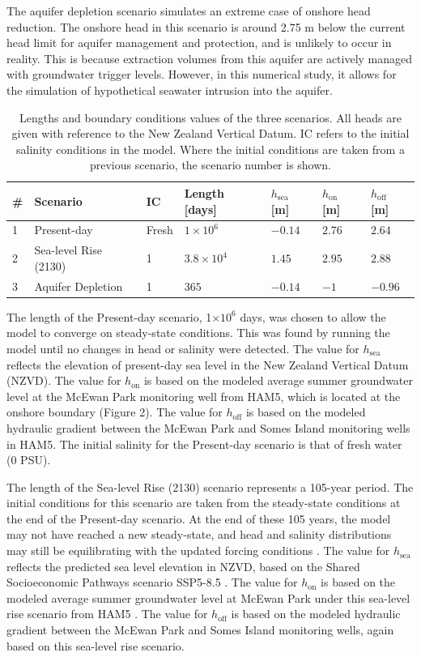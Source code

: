 \documentclass[pdflatex,sn-apa]{sn-jnl}%
\begin{document}
The aquifer depletion scenario simulates an extreme case of onshore head reduction.
The onshore head in this scenario is around 2.75 m below the current head limit for aquifer management and protection, and is unlikely to occur in reality.
This is because extraction volumes from this aquifer are actively managed with groundwater trigger levels.
However, in this numerical study, it allows for the simulation of hypothetical seawater intrusion into the aquifer.


\begin{table}[h!]
\centering
\caption{Lengths and boundary conditions values of the three scenarios. All heads are given with reference to the New Zealand Vertical Datum. IC refers to the initial salinity conditions in the model. Where the initial conditions are taken from a previous scenario, the scenario number is shown.}
\begin{tabular}{lllllll}
\hline
\# & Scenario & IC &Length [days] & $h_{\mathrm{sea}}$ [m] & $h_{\mathrm{on}}$ [m] & $h_{\mathrm{off}}$ [m] \\
\hline
1 & Present-day & Fresh & $1\times 10^{6}$& $-0.14$  & $2.76$ & $2.64$\\
2 & Sea-level Rise (2130) & 1 & $3.8\times 10^{4}$ & $1.45$  & $2.95$ & $2.88$\\
3 & Aquifer Depletion & 1 & $365$& $-0.14$  & $-1$ & $-0.96$\\
\hline
\end{tabular}
\label{tab:table_stages}
\end{table}

The length of the Present-day scenario, 1$\times10^6$ days, was chosen to allow the model to converge on steady-state conditions.
This was found by running the model until no changes in head or salinity were detected.
The value for $h_{\mathrm{sea}}$ reflects the elevation of present-day sea level in the New Zealand Vertical Datum (NZVD).
The value for $h_{\mathrm{on}}$ is based on the modeled average summer groundwater level at the McEwan Park monitoring well from HAM5, which is located at the onshore boundary (Figure 2).
The value for $h_{\mathrm{off}}$ is based on the modeled hydraulic gradient between the McEwan Park and Somes Island monitoring wells in HAM5.
The initial salinity for the Present-day scenario is that of fresh water (0 PSU).

The length of the Sea-level Rise (2130) scenario represents a 105-year period.
The initial conditions for this scenario are taken from the steady-state conditions at the end of the Present-day scenario.
At the end of these 105 years, the model may not have reached a new steady-state, and head and salinity distributions may still be equilibrating with the updated forcing conditions \citep{lu_timescales_2013}.
The value for $h_{\mathrm{sea}}$ reflects the predicted sea level elevation in NZVD, based on the Shared Socioeconomic Pathways scenario SSP5-8.5 \citep{nzsearise_takiwa_2023}.
The value for $h_{\mathrm{on}}$ is based on the modeled average summer groundwater level at McEwan Park under this sea-level rise scenario from HAM5 \citep{bennett_hutt_2024}.
The value for $h_{\mathrm{off}}$ is based on the modeled hydraulic gradient between the McEwan Park and Somes Island monitoring wells, again based on this sea-level rise scenario.
\end{document}
